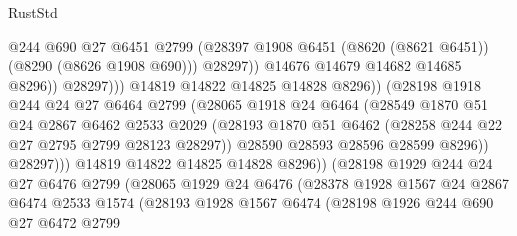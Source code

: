 \begin{lexlean}{RustStd}
\begin{coremodule}
                                      @244
                                      @690
                                      @27
                                      @6451
                                      @2799
                                      (@28397
                                        @1908
                                        @6451
                                        (@8620 (@8621 @6451))
                                        (@8290 (@8626 @1908 @690)))
                                      @28297))
                                  @14676
                                  @14679
                                  @14682
                                  @14685
                                  @8296))
                              @28297)))
                        @14819
                        @14822
                        @14825
                        @14828
                        @8296))
                    (@28198
                      @1918
                      @244
                      @24
                      @27
                      @6464
                      @2799
                      (@28065
                        @1918
                        @24
                        @6464
                        (@28549
                          @1870
                          @51
                          @24
                          @2867
                          @6462
                          @2533
                          @2029
                          (@28193 @1870 @51 @6462 (@28258 @244 @22 @27 @2795 @2799 @28123 @28297))
                          @28590
                          @28593
                          @28596
                          @28599
                          @8296))
                      @28297)))
                @14819
                @14822
                @14825
                @14828
                @8296))
            (@28198
              @1929
              @244
              @24
              @27
              @6476
              @2799
              (@28065
                @1929
                @24
                @6476
                (@28378
                  @1928
                  @1567
                  @24
                  @2867
                  @6474
                  @2533
                  @1574
                  (@28193
                    @1928
                    @1567
                    @6474
                    (@28198
                      @1926
                      @244
                      @690
                      @27
                      @6472
                      @2799

\end{coremodule}
\end{lexlean}
